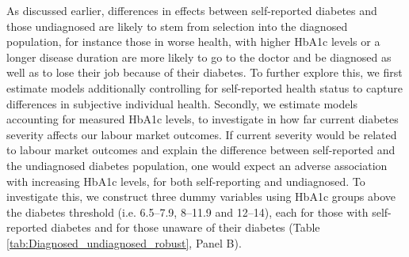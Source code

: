 As discussed earlier, differences in effects between self-reported diabetes and those undiagnosed are likely to stem from selection into the diagnosed population, for instance those in worse health, with higher \ac{HbA1c} levels or a longer disease duration are more likely to go to the doctor and be diagnosed as well as to lose their job because of their diabetes. To further explore this, we first estimate models additionally controlling for self-reported health status to capture differences in subjective individual health. Secondly, we estimate models accounting for measured \ac{HbA1c} levels, to  investigate in how far current diabetes severity affects our labour market outcomes. If current severity would be related to labour market outcomes and explain the difference between self-reported and the undiagnosed diabetes population, one would expect an adverse association with increasing \ac{HbA1c} levels, for both self-reporting and undiagnosed. To investigate this, we construct three dummy variables using \ac{HbA1c} groups above the diabetes threshold (i.e. 6.5--7.9, 8--11.9 and 12--14), each for those with self-reported diabetes and for those unaware of their diabetes (Table \ref{tab:Diagnosed_undiagnosed_robust}, Panel B).

